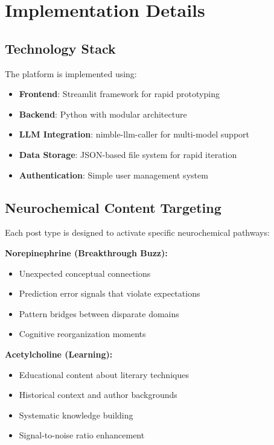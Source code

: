 \documentclass{article}
\begin{document}
\section{Implementation Details}

\subsection{Technology Stack}

The platform is implemented using:
\begin{itemize}
    \item \textbf{Frontend}: Streamlit framework for rapid prototyping
    \item \textbf{Backend}: Python with modular architecture
    \item \textbf{LLM Integration}: nimble-llm-caller for multi-model support
    \item \textbf{Data Storage}: JSON-based file system for rapid iteration
    \item \textbf{Authentication}: Simple user management system
\end{itemize}

\subsection{Neurochemical Content Targeting}

Each post type is designed to activate specific neurochemical pathways:

\textbf{Norepinephrine (Breakthrough Buzz):}
\begin{itemize}
    \item Unexpected conceptual connections
    \item Prediction error signals that violate expectations
    \item Pattern bridges between disparate domains
    \item Cognitive reorganization moments
\end{itemize}

\textbf{Acetylcholine (Learning):}
\begin{itemize}
    \item Educational content about literary techniques
    \item Historical context and author backgrounds
    \item Systematic knowledge building
    \item Signal-to-noise ratio enhancement
\end{itemize}
\end{document}
